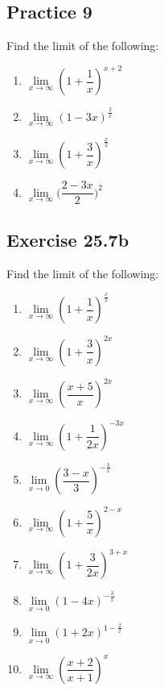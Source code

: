 \documentclass[12pt]{report}
\begin{document}
\subsection*{Practice 9}

Find the limit of the following: \setlength{\columnseprule}{1pt}
\setlength{\columnsep}{24pt}
\begin{multicols}{2}
  \begin{enumerate}
    \item $\lim\limits_{x\to\infty}\left(1+{\dfrac{1}{x}}\right)^{x+2}$
    \item $\lim\limits_{x\to\infty}\left(1-3x\right)^{\frac{2}{x}}$
    \item $\lim\limits_{x\to\infty}\left(1+\dfrac{3}{x}\right)^{\frac{x}{2}}$
    \item $\lim\limits_{x\to\infty}\biggl(\dfrac{2-3x}{2}\biggr)^{2}$
  \end{enumerate}
\end{multicols}

\subsection*{Exercise 25.7b}

Find the limit of the following: \setlength{\columnseprule}{1pt}
\setlength{\columnsep}{24pt}
\begin{multicols}{2}
  \begin{enumerate}
    \item $\lim\limits_{x\to\infty}\left(1+\dfrac{1}{x}\right)^{\frac{x}{2}}$
    \item $\lim\limits_{x\to\infty}\left(1+\dfrac{3}{x}\right)^{2x}$
    \item $\lim\limits_{x\to\infty}\left({\dfrac{x+5}{x}}\right)^{2x}$
    \item $\lim\limits_{x\to\infty}\left(1+{\dfrac{1}{2x}}\right)^{-3x}$
    \item $\lim\limits_{x\to0}\left({\dfrac{3-x}{3}}\right)^{-{\frac{3}{x}}}$
    \item $\lim\limits_{x\to\infty}\left(1+{\dfrac{5}{x}}\right)^{2-x}$
    \item $\lim\limits_{x\to\infty}\left(1+\dfrac{3}{2x}\right)^{3+x}$
    \item $\lim\limits_{x\to0}\left(1-4x\right)^{-\frac{3}{x}}$
    \item $\lim\limits_{x\to0}\left(1+2x\right)^{1-\frac{2}{x}}$
    \item $\lim\limits_{x\to\infty}\left({\dfrac{x+2}{x+1}}\right)^{x}$
  \end{enumerate}
\end{multicols}
\end{document}
